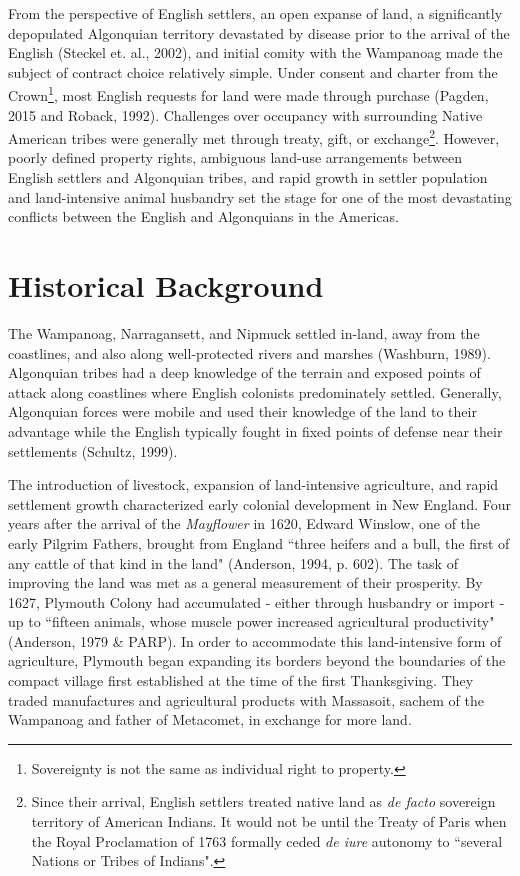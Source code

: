\documentclass[11pt, oneside]{article}
\begin{document}
From the perspective of English settlers, an open expanse of land, a significantly depopulated Algonquian territory devastated by disease prior to the arrival of the English (Steckel et. al., 2002), and initial comity with the Wampanoag made the subject of contract choice relatively simple. Under consent and charter from the Crown\footnote{Sovereignty is not the same as individual right to property.}, most English requests for land were made through purchase (Pagden, 2015 and Roback, 1992). Challenges over occupancy with surrounding Native American tribes were generally met through treaty, gift, or exchange\footnote{Since their arrival, English settlers treated native land as {\em de facto} sovereign territory of American Indians. It would not be until the Treaty of Paris when the Royal Proclamation of 1763 formally ceded {\em de iure} autonomy to ``several Nations or Tribes of Indians".}. However, poorly defined property rights, ambiguous land-use arrangements between English settlers and Algonquian tribes, and rapid growth in settler population and land-intensive animal husbandry set the stage for one of the most devastating conflicts between the English and Algonquians in the Americas.

\section{Historical Background}

The Wampanoag, Narragansett, and Nipmuck settled in-land, away from the coastlines, and also along well-protected rivers and marshes (Washburn, 1989). Algonquian tribes had a deep knowledge of the terrain and exposed points of attack along coastlines where English colonists predominately settled. Generally, Algonquian forces were mobile and used their knowledge of the land to their advantage while the English typically fought in fixed points of defense near their settlements (Schultz, 1999). 

The introduction of livestock, expansion of land-intensive agriculture, and rapid settlement growth characterized early colonial development in New England. Four years after the arrival of the {\em Mayflower} in 1620, Edward Winslow, one of the early Pilgrim Fathers, brought from England ``three heifers and a bull, the first of any cattle of that kind in the land" (Anderson, 1994, p. 602). The task of improving the land was met as a general measurement of their prosperity. By 1627, Plymouth Colony had accumulated - either through husbandry or import - up to ``fifteen animals, whose muscle power increased agricultural productivity" (Anderson, 1979 \& PARP). In order to accommodate this land-intensive form of agriculture, Plymouth began expanding its borders beyond the boundaries of the compact village first established at the time of the first Thanksgiving. They traded manufactures and agricultural products with Massasoit, sachem of the Wampanoag and father of Metacomet, in exchange for more land.
\end{document}
